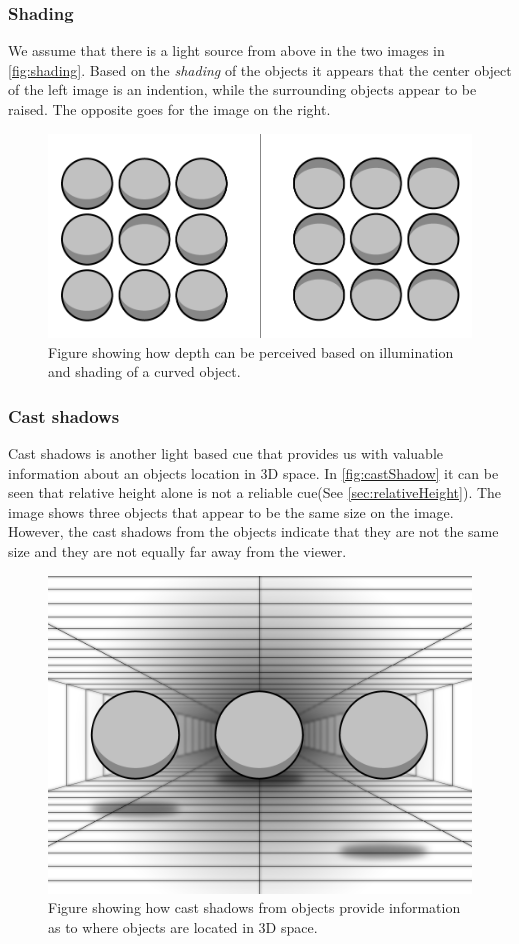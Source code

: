 \subsubsection{Shading}
We assume that there is a light source from above in the two images in \autoref{fig:shading}. Based on the \textit{shading} of the objects it appears that the center object of the left image is an indention, while the surrounding objects appear to be raised. The opposite goes for the image on the right\citep[p.~202]{sensationPerception}.
\begin{figure}[H]
	\centering
	\includegraphics[width=0.6\linewidth]{figure/Analysis/shading.png}
	\caption{Figure showing how depth can be perceived based on illumination and shading of a curved object.}
	\label{fig:shading}
\end{figure}

\subsubsection{Cast shadows}
Cast shadows is another light based cue that provides us with valuable information about an objects location in 3D space. In \autoref{fig:castShadow} it can be seen that relative height alone is not a reliable cue(See \autoref{sec:relativeHeight}). The image shows three objects that appear to be the same size on the image. However, the cast shadows from the objects indicate that they are not the same size and they are not equally far away from the viewer\citep[p.~203]{sensationPerception}.
\begin{figure}[H]
	\centering
	\includegraphics[width=0.6\linewidth]{figure/Frontpage/frontpage2.png}
	\caption{Figure showing how cast shadows from objects provide information as to where objects are located in 3D space.}
	\label{fig:castShadow}
\end{figure}

